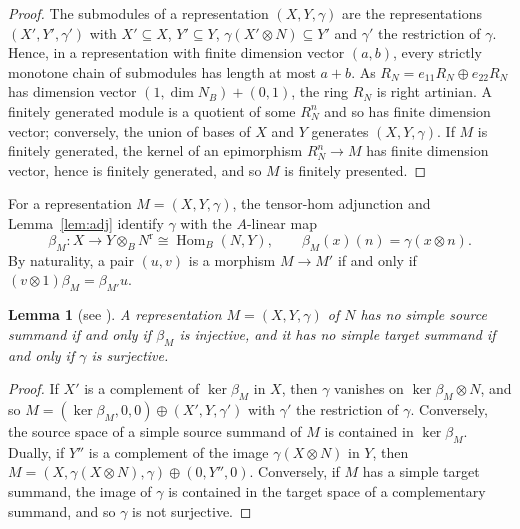 \documentclass[11pt,a4paper]{amsart}
\newtheorem{lemma}[theorem]{Lemma}
\numberwithin{equation}{section}
\newcommand{\Hom}{\operatorname{Hom}}
\newcommand{\rr}{\mathrm{r}}
\begin{document}
\begin{proof}
The submodules of a representation $(X,Y,\gamma)$ are the representations $(X',Y',\gamma')$ with $X'\subseteq X$, $Y'\subseteq Y$, $\gamma(X'\otimes N)\subseteq Y'$ and $\gamma'$ the restriction of $\gamma$. Hence, in a representation with finite dimension vector $(a,b)$, every strictly monotone chain of submodules has length at most $a+b$. As $R_N=e_{11}R_N\oplus e_{22}R_N$ has dimension vector $(1,\dim N_B)+(0,1)$, the ring $R_N$ is right artinian. A finitely generated module is a quotient of some $R_N^n$ and so has finite dimension vector; conversely, the union of bases of $X$ and $Y$ generates $(X,Y,\gamma)$. If $M$ is finitely generated, the kernel of an epimorphism $R_N^n\to M$ has finite dimension vector, hence is finitely generated, and so $M$ is finitely presented.
\end{proof}

For a representation $M=(X,Y,\gamma)$, the tensor-hom adjunction and Lemma~\ref{lem:adj} identify $\gamma$ with the $A$-linear map
\[
\beta_M\colon X\to Y\otimes_BN^{\rr}\cong\Hom_B(N,Y),\qquad \beta_M(x)(n)=\gamma(x\otimes n).
\]
By naturality, a pair $(u,v)$ is a morphism $M\to M'$ if and only if $(v\otimes1)\beta_M=\beta_{M'}u$.

\begin{lemma}[{see \cite{DR,Si81}}]\label{lem:split}
A representation $M=(X,Y,\gamma)$ of $N$ has no simple source summand if and only if $\beta_M$ is injective, and it has no simple target summand if and only if $\gamma$ is surjective.
\end{lemma}

\begin{proof}
If $X'$ is a complement of $\ker\beta_M$ in $X$, then $\gamma$ vanishes on $\ker\beta_M\otimes N$, and so $M=(\ker\beta_M,0,0)\oplus(X',Y,\gamma')$ with $\gamma'$ the restriction of $\gamma$. Conversely, the source space of a simple source summand of $M$ is contained in $\ker\beta_M$. Dually, if $Y''$ is a complement of the image $\gamma(X\otimes N)$ in $Y$, then $M=(X,\gamma(X\otimes N),\gamma)\oplus(0,Y'',0)$. Conversely, if $M$ has a simple target summand, the image of $\gamma$ is contained in the target space of a complementary summand, and so $\gamma$ is not surjective.
\end{proof}
\end{document}
